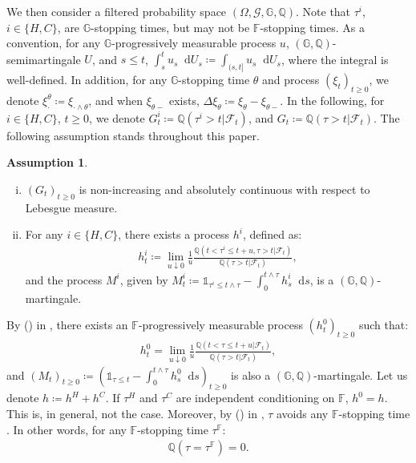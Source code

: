 \documentclass[a4paper, 11pt]{article}              %
\numberwithin{equation}{section}
\theoremstyle{plain}
\newcommand{\1}{\mathds{1}}
\newcommand{\calF}{\mathcal{F}}
\newcommand{\calG}{\mathcal{G}}
\newcommand{\dsF}{\mathbb{F}}
\newcommand{\dsQ}{\mathbb{Q}}
\newcommand{\dsG}{\mathbb{G}}
\newcommand{\IT}{^i_t}
\theoremstyle{plain}
\newtheorem{assumption}[thm]{Assumption}
\theoremstyle{definition}
\newtheorem{assumption}{Assumption}
\theoremstyle{plain}
\newcommand*\df{\mathop{}\!\mathrm{d}}
\newcommand{\rom}[1]{\lowercase\expandafter{\romannumeral #1\relax}}
\begin{document}
We then consider a filtered probability space $(\Omega, \calG, \dsG,\dsQ)$.  Note
that $\tau^i$, $i \in \{H, C\}$, are $\dsG$-stopping times, but may not be
$\dsF$-stopping times.  As a convention, for
any $\dsG$-progressively measurable process $u$, $(\dsG, \dsQ)$-semimartingale
$U$, and $s \leq t$,
$\int_{s}^{t}u_s \df U_s \coloneqq \int_{(s, t]}^{}u_s\df U_s$, where the integral is
well-defined. In addition, for any $\dsG$-stopping time $\theta$ and process
$(\xi_t)_{t \geq0}$, we denote
$\xi^\theta_\cdot \coloneqq \xi_{\cdot \wedge \theta}$, and when $\xi_{\theta-}$ exists,
$\Delta \xi_\theta\coloneqq \xi_\theta - \xi_{\theta-}$.  In the following, for
$i \in \{H, C\}$, $t \geq0$, we denote
$G\IT \coloneqq \dsQ(\tau^i > t|\calF_t)$, and
$G_t\coloneqq \dsQ(\tau > t|\calF_t)$.  The following assumption stands throughout
this paper.
\begin{assumption}\label{assm:intensity}
\begin{enumerate}[(i)]
\item $(G_t)_{t \geq0}$ is non-increasing and absolutely continuous
  with respect to Lebesgue measure. 
\item For any $i \in \{H, C\}$, there exists a process $h^i$, defined as:
\begin{align}
  h^i_t \coloneqq \lim_{u\downarrow0}\frac{1}{u}\frac{\dsQ(t < \tau^i \leq t+u, \tau > t|\calF_t)}{\dsQ(\tau >
  t|\calF_t)}, \nonumber 
\end{align}
and the process $M^i$, given by
$M^i_t \coloneqq \1_{\tau^i \leq t \wedge \tau}   - \int_{0}^{t \wedge \tau}h^i_s \df s$,
is a $(\dsG, \dsQ)$-martingale. 
\end{enumerate} 
\end{assumption}  
By (\rom{1}) in
, there exists an $\dsF$-progressively measurable process
$(h^0_t)_{t\geq0}$ such that:
\begin{align}
   h^0_t = \lim_{u\downarrow0}\frac{1}{u}\frac{\dsQ(t < \tau \leq t+u|\calF_t)}{\dsQ(\tau >
  t|\calF_t)},  \nonumber 
\end{align}
and
$(M_t)_{t\geq0}\coloneqq(\1_{\tau\leq t} - \int_{0}^{t\wedge\tau}h^0_s\df s)_{t\geq0}$ 
is also a $(\dsG, \dsQ)$-martingale. Let us denote $h \coloneqq h^H + h^C$. If
$\tau^H$ and $\tau^C$ are independent  conditioning on $\dsF$, $h^0 = h$. This is, in general, not the
case.  Moreover, by (\rom{1}) in , $\tau$ avoids any
$\dsF$-stopping time \cite[see][Corollary 3.4]{coculescu2012hazard}. In other
words, for any $\dsF$-stopping time $\tau^\dsF$:
\begin{align} 
 \dsQ(\tau = \tau^\dsF) = 0.  \label{avoid}
\end{align}
\end{document}
